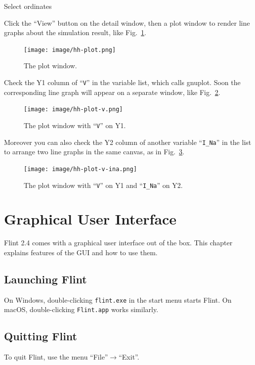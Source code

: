 \documentclass[a4paper,10pt]{report}
\begin{document}
\begin{description}
\item[{Select ordinates}] 
\end{description}
Click the ``View'' button on the detail window, then a plot window to render
line graphs about the simulation result, like Fig.~\ref{fig:org01ea360}.

\begin{figure}[htbp]
\centering
\texttt{[image: image/hh-plot.png]}
\caption{\label{fig:org01ea360}The plot window.}
\end{figure}

Check the Y1 column of ``\texttt{V}'' in the variable list, which calls gnuplot.
Soon the corresponding line graph will appear on a separate window,
like Fig.~\ref{fig:org5d53474}.

\begin{figure}[htbp]
\centering
\texttt{[image: image/hh-plot-v.png]}
\caption{\label{fig:org5d53474}The plot window with ``\texttt{V}'' on Y1.}
\end{figure}

Moreover you can also check the Y2 column of another variable ``\texttt{I\_Na}'' in the
list to arrange two line graphs in the same canvas, as in
Fig.~\ref{fig:orge2c8ffc}.

\begin{figure}[htbp]
\centering
\texttt{[image: image/hh-plot-v-ina.png]}
\caption{\label{fig:orge2c8ffc}The plot window with ``\texttt{V}'' on Y1 and ``\texttt{I\_Na}'' on Y2.}
\end{figure}

\chapter{Graphical User Interface}
\label{sec:org3d11536}
Flint 2.4 comes with a graphical user interface out of the box. This chapter
explains features of the GUI and how to use them.

\section{Launching Flint}
\label{sec:org5f833cc}
On Windows, double-clicking \texttt{flint.exe} in the start menu starts Flint.
On macOS, double-clicking \texttt{Flint.app} works similarly.

\section{Quitting Flint}
\label{sec:orgf430f4a}
To quit Flint, use the menu ``File''\(\to\)``Exit''.
\end{document}
